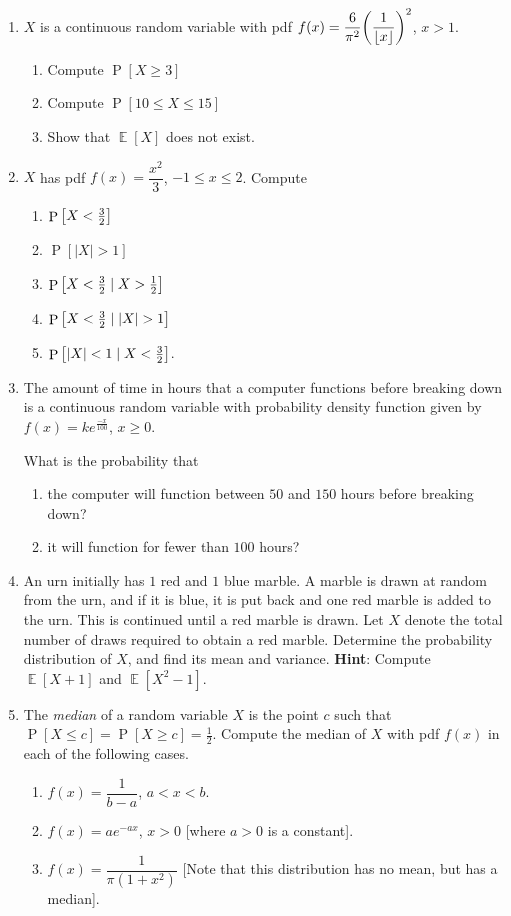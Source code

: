 \documentclass[svgnames]{amsart}
\DeclareMathOperator{\Prob}{P}
\DeclareMathOperator{\EV}{\mathbb E}
\begin{document}
\begin{enumerate}[leftmargin=*, itemsep=0.3em]
\item $X$ is a continuous random variable with pdf $f(x) = \dfrac 6 {\pi^2} \pqty{\dfrac 1 {\lfloor x \rfloor}}^2$, $x > 1$.
\begin{enumerate}
	\item Compute $\Prob[X \ge 3]$
	\item Compute $\Prob[10 \le X \le 15]$
	\item Show that $\EV[X]$ does not exist.
\end{enumerate}

\item $X$ has pdf $f(x) = \dfrac{x^2}{3}$, $-1 \le x \le 2$. Compute
\begin{enumerate}
	\item $\Prob \bqty{X < \frac 3 2}$
	\item $\Prob[|X| > 1]$
	\item $\Prob \bqty{X < \frac 3 2 \mid X > \frac 1 2}$
	\item $\Prob \bqty{X < \frac 3 2 \mid |X| > 1}$
	\item $\Prob \bqty{|X| < 1 \mid X < \frac 3 2}$.
\end{enumerate}

\item The amount of time in hours that a computer functions before breaking down is a continuous random variable with probability density function given by $f(x) = k e^{\frac{-x}{100}}$, $x \ge 0$.

What is the probability that
\begin{enumerate}
    \item the computer will function between $50$ and $150$ hours before breaking down?
    \item it will function for fewer than $100$ hours?
\end{enumerate}

\item An urn initially has {\color{red} $1$ red} and {\color{blue} $1$ blue} marble. A marble is drawn at random from the urn, and if it is {\color{blue} blue}, it is put back and {\color{red} one red} marble is added to the urn. This is continued until a {\color{red} red} marble is drawn. Let $X$ denote the total number of draws required to obtain a {\color{red} red} marble. Determine the probability distribution of $X$, and find its mean and variance.
{\scriptsize\textbf{Hint}: Compute $\EV[X + 1]$ and $\EV[X^2 - 1]$.}

\item The \emph{median} of a random variable $X$ is the point $c$ such that $\Prob[X \le c] = \Prob[X \ge c] = \frac 1 2$. Compute the median of $X$ with pdf $f(x)$ in each of the following cases.
\begin{enumerate}[itemsep=1em]
	\item $f(x) = \dfrac 1 {b - a}$, $a < x < b$.
	\item $f(x) = a e^{-ax}$, $x > 0$ [where $a > 0$ is a constant].
	\item $f(x) = \dfrac{1}{\pi(1 + x^2)}$ [Note that this distribution has no mean, but has a median].
\end{enumerate}


\end{enumerate}
\end{document}
